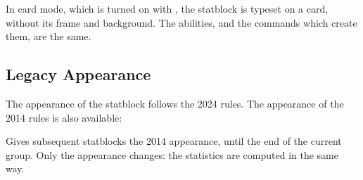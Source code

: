 		In card mode, which is turned on with  , the statblock is typeset on a card, without its frame and background. The abilities, and the commands which create them, are the same.

	\subsection{Legacy Appearance}\label{S:DndStatLegacy}

		The appearance of the statblock follows the 2024 rules. The appearance of the 2014 rules is also available:

		{
			Gives subsequent statblocks the 2014 appearance, until the end of the current group. Only the appearance changes: the statistics are computed in the same way.
		}

